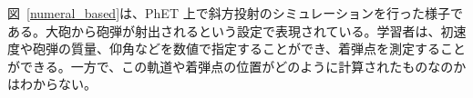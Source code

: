 図~\ref{numeral_based}は、PhET 上で斜方投射のシミュレーションを行った様子である。大砲から砲弾が射出されるという設定で表現されている。学習者は、初速度や砲弾の質量、仰角などを数値で指定することができ、着弾点を測定することができる。一方で、この軌道や着弾点の位置がどのように計算されたものなのかはわからない。





